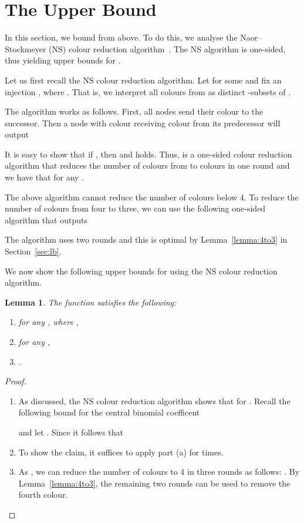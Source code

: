 \documentclass[a4paper,11pt]{article}
\newtheorem{lemma}[theorem]{Lemma}
\theoremstyle{remark}
\begin{document}
\section{The Upper Bound}

In this section, we bound  from above. To do this, we analyse the Naor--Stockmeyer (NS) colour reduction algorithm~\cite{naor95what}. The NS algorithm is one-sided, thus yielding upper bounds for .

Let us first recall the NS colour reduction algorithm. Let  for some  and fix an injection , where . That is, we interpret all colours from  as distinct -subsets of .

The algorithm works as follows. First, all nodes send their colour to the successor. Then a node with colour  receiving colour  from its predecessor will output

It is easy to show that if , then  and  holds. Thus,  is a one-sided colour reduction algorithm that reduces the number of colours from  to  colours in one round and we have that  for any .

The above algorithm cannot reduce the number of colours below 4. To reduce the number of colours from four to three, we can use the following one-sided algorithm  that outputs

The algorithm uses two rounds and this is optimal by Lemma~\ref{lemma:4to3} in Section~\ref{sec:lb}.

We now show the following upper bounds for  using the NS colour reduction algorithm.

\begin{lemma}\label{lemma:ns}
 The function  satisfies the following:
 \begin{enumerate}[label=(\alph*)]
  \item  for any , where , 
  \item  for any ,
  \item .
 \end{enumerate}
\end{lemma}
\begin{proof}\mbox{}
 \begin{enumerate}[label=(\alph*)]
 \item As discussed, the NS colour reduction algorithm shows that  for . Recall the following bound for the central binomial coefficent

and let . Since  it follows that 


 \item To show the claim, it suffices to apply part (a) for  times. 

 \item As , we can reduce the number of colours to 4 in three rounds as follows: . By Lemma~\ref{lemma:4to3}, the remaining two rounds can be used to remove the fourth colour. \qedhere
 \end{enumerate}
\end{proof}
\end{document}
